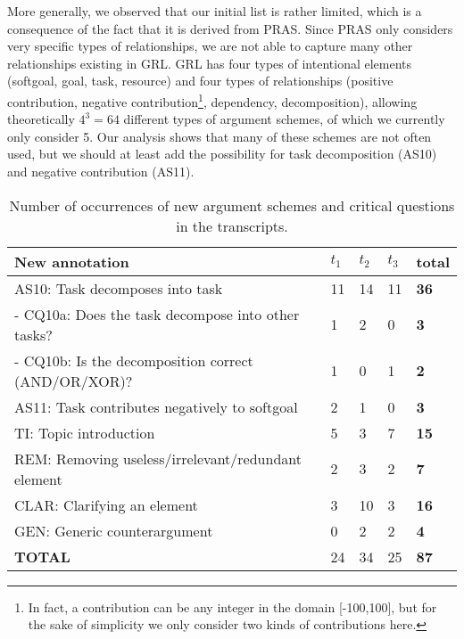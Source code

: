 More generally, we observed that our initial list is rather limited, which is a consequence of the fact that it is derived from PRAS. Since PRAS only considers very specific types of relationships, we are not able to capture many other relationships existing in GRL. GRL has four types of intentional elements (softgoal, goal, task, resource) and four types of relationships (positive contribution, negative contribution\footnote{In fact, a contribution can be any integer in the domain [-100,100], but for the sake of simplicity we only consider two kinds of contributions here.}, dependency, decomposition), allowing theoretically $4^3=64$ different types of argument schemes, of which we currently only consider 5. Our analysis shows that many of these schemes are not often used, but we should at least add the possibility for task decomposition (AS10) and negative contribution (AS11).

\begin{table*}[ht]
\centering
\begin{tabular}{|l|l|l|l|>{\bfseries}l|}
\hline
\textbf{New annotation} & $t_1$ & $t_2$ & $t_3$ & \textbf{total}\\
\hline
AS10: Task decomposes into task & 11 & 14 & 11 & 36\\
\hline
- CQ10a: Does the task decompose into other tasks? & 1 &2 &0&3\\
\hline
- CQ10b: Is the decomposition correct (AND/OR/XOR)? &1 &0& 1 &2\\
\hline
AS11: Task contributes negatively to softgoal&2&1	&0&3\\
\hline
\hline
TI: Topic introduction & 5 & 3 & 7 &15\\
\hline
REM: Removing useless/irrelevant/redundant element & 2 & 3 & 2 &7\\
\hline
CLAR: Clarifying an element &3 &10 & 3 & 16\\
\hline
GEN: Generic counterargument	& 0& 2 & 2 & 4\\
\hline
\textbf{TOTAL}&24&34&25&87\\
\hline
\end{tabular}
\caption{Number of occurrences of new argument schemes and critical questions in the transcripts.}
\label{table:transcripts:results:new}
\end{table*}


